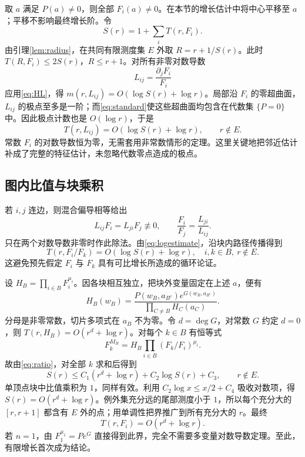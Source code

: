 \documentclass[UTF8,11pt,a4paper,fontset=fandol]{ctexart}
\theoremstyle{definition}\newtheorem{definition}[theorem]{定义}
\theoremstyle{remark}\newtheorem{remark}[theorem]{注}
\begin{document}
取 $a$ 满足 $P(a)\ne0$，则全部 $F_i(a)\ne0$。在本节的增长估计中将中心平移至 $a$；平移不影响最终增长阶。令
\[
S(r)=1+\sum_iT(r,F_i).
\]
由引理\ref{lem:radius}，在共同有限测度集 $E$ 外取 $R=r+1/S(r)$。此时 $T(R,F_i)\le2S(r)$，$R\le r+1$。对所有非零对数导数
\[
L_{ij}=\frac{\partial_jF_i}{F_i}
\]
应用\eqref{eq:HL}，得 $m(r,L_{ij})=O(\log S(r)+\log r)$。局部沿 $F_i$ 的零超曲面，$L_{ij}$ 的极点至多是一阶；而\eqref{eq:standard}使这些超曲面均包含在代数集 $\{P=0\}$ 中。因此极点计数也是 $O(\log r)$，于是
\begin{equation}\label{eq:logestimate}
T(r,L_{ij})=O(\log S(r)+\log r),\qquad r\notin E.
\end{equation}
常数 $F_i$ 的对数导数恒为零，无需套用非常数情形的定理。这里关键地把邻近估计补成了完整的特征估计，未忽略代数零点造成的极点。

\subsection{图内比值与块乘积}
若 $i,j$ 连边，则混合偏导相等给出
\[
L_{ij}F_i=L_{ji}F_j\not\equiv0,\qquad
\frac{F_i}{F_j}=\frac{L_{ji}}{L_{ij}}.
\]
只在两个对数导数非零时作此除法。由\eqref{eq:logestimate}，沿块内路径传播得到
\begin{equation}\label{eq:ratio}
T(r,F_i/F_k)=O(\log S(r)+\log r),\quad i,k\in B,\ r\notin E.
\end{equation}
这避免预先假定 $F_i$ 与 $F_k$ 具有可比增长所造成的循环论证。

设 $H_B=\prod_{i\in B}F_i^{\mu_i}$。因各块相互独立，把块外变量固定在上述 $a$，便有
\begin{equation}\label{eq:slice}
H_B(w_B)=\frac{P(w_B,a_{B^c})e^{G(w_B,a_{B^c})}}
{\prod_{C\ne B}H_C(a_C)}.
\end{equation}
分母是非零常数，切片多项式在 $a_B$ 不为零。令 $d=\deg G$，对常数 $G$ 约定 $d=0$，则 $T(r,H_B)=O(r^d+\log r)$。对每个 $k\in B$ 有恒等式
\begin{equation}\label{eq:keyidentity}
F_k^{M_B}=H_B\prod_{i\in B}(F_k/F_i)^{\mu_i}.
\end{equation}
故由\eqref{eq:ratio}，对全部 $k$ 求和后得到
\begin{equation}\label{eq:absorb}
S(r)\le C_1(r^d+\log r)+C_2\log S(r)+C_3,\qquad r\notin E.
\end{equation}
单顶点块中比值乘积为 $1$，同样有效。利用 $C_2\log x\le x/2+C_4$ 吸收对数项，得 $S(r)=O(r^d+\log r)$。例外集充分远的尾部测度小于 $1$，所以每个充分大的 $[r,r+1]$ 都含有 $E$ 外的点；用单调性把界推广到所有充分大的 $r$。最终
\begin{equation}\label{eq:Tbound}
T(r,F_i)=O(r^d+\log r).
\end{equation}
若 $n=1$，由 $F_1^{\mu_1}=Pe^G$ 直接得到此界，完全不需要多变量对数导数定理。至此，有限增长首次成为结论。
\end{document}
